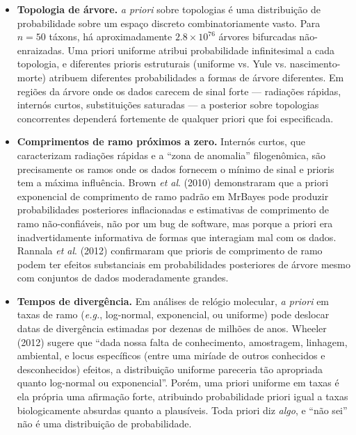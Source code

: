 \begin{itemize}
    \item \textbf{Topologia de árvore.} \textit{a priori} sobre topologias é uma distribuição de probabilidade sobre um espaço discreto combinatoriamente vasto. Para $n = 50$ táxons, há aproximadamente $2.8 \times 10^{76}$ árvores bifurcadas não-enraizadas. Uma priori uniforme atribui probabilidade infinitesimal a cada topologia, e diferentes prioris estruturais (uniforme vs. Yule vs. nascimento-morte) atribuem diferentes probabilidades a formas de árvore diferentes. Em regiões da árvore onde os dados carecem de sinal forte --- radiações rápidas, internós curtos, substituições saturadas --- a posterior sobre topologias concorrentes dependerá fortemente de qualquer priori que foi especificada.

    \item \textbf{Comprimentos de ramo próximos a zero.} Internós curtos, que caracterizam radiações rápidas e a ``zona de anomalia'' filogenômica, são precisamente os ramos onde os dados fornecem o mínimo de sinal e prioris tem a máxima influência. Brown \textit{et al}. (2010) demonstraram que a priori exponencial de comprimento de ramo padrão em MrBayes pode produzir probabilidades posteriores inflacionadas e estimativas de comprimento de ramo não-confiáveis, não por um bug de software, mas porque a priori era inadvertidamente informativa de formas que interagiam mal com os dados. Rannala \textit{et al}. (2012) confirmaram que prioris de comprimento de ramo podem ter efeitos substanciais em probabilidades posteriores de árvore mesmo com conjuntos de dados moderadamente grandes.

    \item \textbf{Tempos de divergência.} Em análises de relógio molecular, \textit{a priori} em taxas de ramo (\textit{e.g.}, log-normal, exponencial, ou uniforme) pode deslocar datas de divergência estimadas por dezenas de milhões de anos. Wheeler (2012) sugere que ``dada nossa falta de conhecimento, amostragem, linhagem, ambiental, e locus específicos (entre uma miríade de outros conhecidos e desconhecidos) efeitos, a distribuição uniforme pareceria tão apropriada quanto log-normal ou exponencial''. Porém, uma priori uniforme em taxas é ela própria uma afirmação forte, atribuindo probabilidade priori igual a taxas biologicamente absurdas quanto a plausíveis. Toda priori diz \textit{algo}, e ``não sei'' não é uma distribuição de probabilidade.
\end{itemize}

